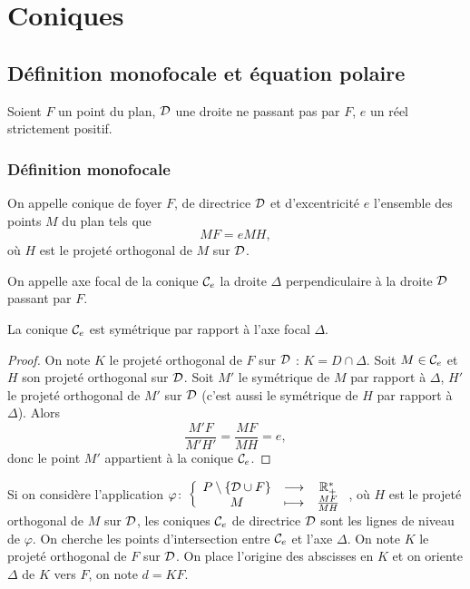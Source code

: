 \chapter{Coniques}
\minitoc
\minilof
\minilot
\section{Définition monofocale et équation polaire}
Soient \(F\) un point du plan, \(\mathcal{D}\) une droite ne passant pas par \(F\), 
\(e\) un réel strictement positif.
\subsection{Définition monofocale}
\begin{defdef}
  On appelle conique de foyer \(F\), de directrice \(\mathcal{D}\) et d'excentricité 
  \(e\) l'ensemble des points \(M\) du plan tels que
  \begin{equation}
    MF=e MH,
  \end{equation}
  où \(H\) est le projeté orthogonal de \(M\) sur \(\mathcal{D}\).
\end{defdef}
\begin{defdef}
  On appelle axe focal de la conique \(\mathcal{C}_{e}\) la droite \(\Delta\) 
  perpendiculaire à la droite \(\mathcal{D}\) passant par \(F\).
\end{defdef}
\begin{prop}
  La conique \(\mathcal{C}_{e}\) est symétrique par rapport à l'axe focal \(\Delta\).
\end{prop}
\begin{proof}
  On note \(K\) le projeté orthogonal de \(F\) sur \(\mathcal{D}\) : \(K=D \cap 
  \Delta\). Soit \(M \in \mathcal{C}_{e}\) et \(H\) son projeté orthogonal sur \(\mathcal{D}\). 
  Soit \(M'\) le symétrique de \(M\) par rapport à \(\Delta\), \(H'\) le projeté 
  orthogonal de \(M'\) sur \(\mathcal{D}\) (c'est aussi le symétrique de \(H\) par 
  rapport à \(\Delta\)). Alors
  \begin{equation}
    \frac{M'F}{M'H'} = \frac{MF}{MH} = e,
  \end{equation}
  donc le point \(M'\) appartient à la conique \(\mathcal{C}_{e}\).
\end{proof}
Si on considère l'application \(\varphi\colon \left\{\begin{array}{ccc} P\setminus\{\mathcal{D} \cup 
F\} & \longrightarrow &\mathbb{R}_{+}^{*}\\ M & \longmapsto & \frac{MF}{MH} \end{array} \right.\), où \(H\) est le projeté orthogonal de 
\(M\) sur \(\mathcal{D}\), les coniques \(\mathcal{C}_{e}\) de directrice \(\mathcal{D}\) sont les 
lignes de niveau de \(\varphi\). On cherche les points d'intersection entre 
\(\mathcal{C}_{e}\) et l'axe \(\Delta\). On note \(K\) le projeté orthogonal de \(F\) 
sur \(\mathcal{D}\). On place l'origine des abscisses en \(K\) et on oriente \(\Delta\) 
de \(K\) vers \(F\), on note \(d=KF\).

